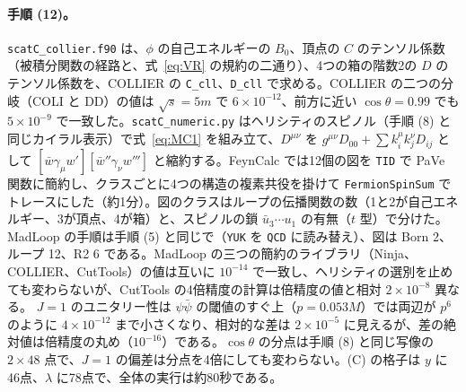 \documentclass[a4paper,10pt]{ltjsarticle}
\begin{document}
\paragraph{手順 (12)。}\texttt{scatC\_collier.f90} は、$\phi$ の自己エネルギーの $B_0$、頂点の $C$ のテンソル係数（被積分関数の経路と、式~\eqref{eq:VR} の規約の二通り）、4つの箱の階数2の $D$ のテンソル係数を、COLLIER の \texttt{C\_cll}、\texttt{D\_cll} で求める。COLLIER の二つの分岐（COLI と DD）の値は $\sqrt s=5m$ で $6\times10^{-12}$、前方に近い $\cos\theta=0.99$ でも $5\times10^{-9}$ で一致した。\texttt{scatC\_numeric.py} はヘリシティのスピノル（手順 (8) と同じカイラル表示）で式~\eqref{eq:MC1} を組み立て、$D^{\mu\nu}$ を $g^{\mu\nu}D_{00}+\sum k_i^\mu k_j^\nu D_{ij}$ として $[\bar w\gamma_\mu w'][\bar w''\gamma_\nu w''']$ と縮約する。FeynCalc では12個の図を \texttt{TID} で PaVe 関数に簡約し、クラスごとに4つの構造の複素共役を掛けて \texttt{FermionSpinSum} でトレースにした（約1分）。図のクラスはループの伝播関数の数（1と2が自己エネルギー、3が頂点、4が箱）と、スピノルの鎖 $\bar u_3\cdots u_1$ の有無（$t$ 型）で分けた。MadLoop の手順は手順 (5) と同じで（\texttt{YUK} を \texttt{QCD} に読み替え）、図は Born 2、ループ 12、R2 6 である。MadLoop の三つの簡約のライブラリ（Ninja、COLLIER、CutTools）の値は互いに $10^{-14}$ で一致し、ヘリシティの選別を止めても変わらないが、CutTools の4倍精度の計算は倍精度の値と相対 $2\times10^{-8}$ 異なる。 $J=1$ のユニタリー性は $\psi\bar\psi$ の閾値のすぐ上（$p=0.053M$）では両辺が $p^6$ のように $4\times10^{-12}$ まで小さくなり、相対的な差は $2\times10^{-5}$ に見えるが、差の絶対値は倍精度の丸め（$10^{-16}$）である。$\cos\theta$ の分点は手順 (8) と同じ写像の $2\times48$ 点で、$J=1$ の偏差は分点を4倍にしても変わらない。(C) の格子は $y$ に46点、$\lambda$ に78点で、全体の実行は約80秒である。
\end{document}
